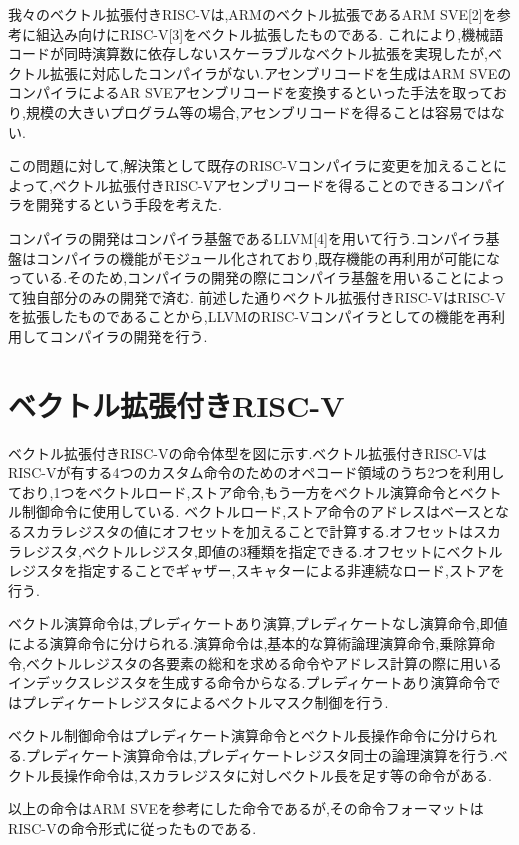 \documentclass[a4paper,9pt, twocolumn]{jarticle}
\begin{document}
我々のベクトル拡張付きRISC-Vは,ARMのベクトル拡張であるARM SVE[2]を参考に組込み向けにRISC-V[3]をベクトル拡張したものである.
これにより,機械語コードが同時演算数に依存しないスケーラブルなベクトル拡張を実現したが,ベクトル拡張に対応したコンパイラがない.アセンブリコードを生成はARM SVEのコンパイラによるAR SVEアセンブリコードを変換するといった手法を取っており,規模の大きいプログラム等の場合,アセンブリコードを得ることは容易ではない.

この問題に対して,解決策として既存のRISC-Vコンパイラに変更を加えることによって,ベクトル拡張付きRISC-Vアセンブリコードを得ることのできるコンパイラを開発するという手段を考えた.

コンパイラの開発はコンパイラ基盤であるLLVM[4]を用いて行う.コンパイラ基盤はコンパイラの機能がモジュール化されており,既存機能の再利用が可能になっている.そのため,コンパイラの開発の際にコンパイラ基盤を用いることによって独自部分のみの開発で済む.
前述した通りベクトル拡張付きRISC-VはRISC-Vを拡張したものであることから,LLVMのRISC-Vコンパイラとしての機能を再利用してコンパイラの開発を行う.

\section{ベクトル拡張付きRISC-V}
ベクトル拡張付きRISC-Vの命令体型を図に示す.ベクトル拡張付きRISC-VはRISC-Vが有する4つのカスタム命令のためのオペコード領域のうち2つを利用しており,1つをベクトルロード,ストア命令,もう一方をベクトル演算命令とベクトル制御命令に使用している.
ベクトルロード,ストア命令のアドレスはベースとなるスカラレジスタの値にオフセットを加えることで計算する.オフセットはスカラレジスタ,ベクトルレジスタ,即値の3種類を指定できる.オフセットにベクトルレジスタを指定することでギャザー,スキャターによる非連続なロード,ストアを行う.

ベクトル演算命令は,プレディケートあり演算,プレディケートなし演算命令,即値による演算命令に分けられる.演算命令は,基本的な算術論理演算命令,乗除算命令,ベクトルレジスタの各要素の総和を求める命令やアドレス計算の際に用いるインデックスレジスタを生成する命令からなる.プレディケートあり演算命令ではプレディケートレジスタによるベクトルマスク制御を行う.

ベクトル制御命令はプレディケート演算命令とベクトル長操作命令に分けられる.プレディケート演算命令は,プレディケートレジスタ同士の論理演算を行う.ベクトル長操作命令は,スカラレジスタに対しベクトル長を足す等の命令がある.

以上の命令はARM SVEを参考にした命令であるが,その命令フォーマットはRISC-Vの命令形式に従ったものである.
\end{document}
